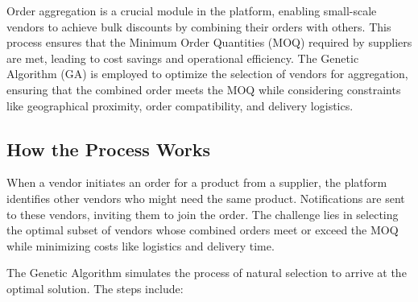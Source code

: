 Order aggregation is a crucial module in the platform, enabling small-scale vendors to achieve bulk discounts by combining their orders with others. This process ensures that the Minimum Order Quantities (MOQ) required by suppliers are met, leading to cost savings and operational efficiency. The Genetic Algorithm (GA) is employed to optimize the selection of vendors for aggregation, ensuring that the combined order meets the MOQ while considering constraints like geographical proximity, order compatibility, and delivery logistics.

\subsection{How the Process Works}

When a vendor initiates an order for a product from a supplier, the platform identifies other vendors who might need the same product. Notifications are sent to these vendors, inviting them to join the order. The challenge lies in selecting the optimal subset of vendors whose combined orders meet or exceed the MOQ while minimizing costs like logistics and delivery time.

The Genetic Algorithm simulates the process of natural selection to arrive at the optimal solution. The steps include:

